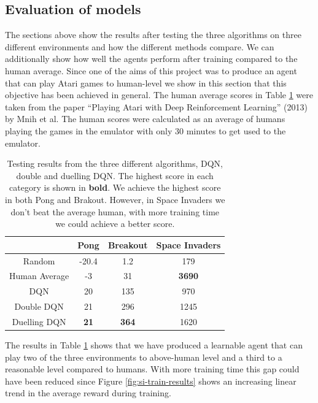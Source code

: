 \subsection{Evaluation of models}

The sections above show the results after testing the three algorithms on three different environments and how the different methods compare. We can additionally show how well the agents perform after training compared to the human average. Since one of the aims of this project was to produce an agent that can play Atari games to human-level we show in this section that this objective has been achieved in general. The human average scores in Table \ref{table:eval:testing-results} were taken from the paper ``Playing Atari with Deep Reinforcement Learning'' (2013) by Mnih et al. The human scores were calculated as an average of humans playing the games in the emulator with only 30 minutes to get used to the emulator.

\begin{table}[htbp]
  \centering
  \begin{tabular}{c|c|c|c|}
    \cline{2-4}
    \multicolumn{1}{l|}{}               & Pong        & Breakout     & Space Invaders \\ \hline
    \multicolumn{1}{|c|}{Random}        & -20.4       & 1.2          & 179            \\ \hline
    \multicolumn{1}{|c|}{Human Average} & -3          & 31           & \textbf{3690}  \\ \hline
    \multicolumn{1}{|c|}{DQN}           & 20          & 135          & 970            \\ \hline
    \multicolumn{1}{|c|}{Double DQN}    & 21          & 296          & 1245           \\ \hline
    \multicolumn{1}{|c|}{Duelling DQN}  & \textbf{21} & \textbf{364} & 1620           \\ \hline
  \end{tabular}
  \caption[Testing results for Standard/Double/Duelling DQN]{Testing results from the three different algorithms, DQN, double and duelling DQN. The highest score in each category is shown in \textbf{bold}. We achieve the highest score in both Pong and Brakout. However, in Space Invaders we don't beat the average human, with more training time we could achieve a better score.}\label{table:eval:testing-results}
\end{table}

The results in Table \ref{table:eval:testing-results} shows that we have produced a learnable agent that can play two of the three environments to above-human level and a third to a reasonable level compared to humans. With more training time this gap could have been reduced since Figure \ref{fig:si-train-results} shows an increasing linear trend in the average reward during training.


